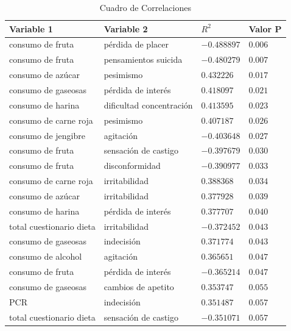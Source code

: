 \documentclass[stu, 12pt]{apa7}
\begin{document}
\begin{table}[H]
	\begin{tabular}{@{}llll@{}}
	\toprule
	\textbf{Variable 1}      & \textbf{Variable 2}      & \textbf{$R^2$}       & \textbf{Valor P} \\ \midrule
		consumo de fruta         & pérdida de placer        & $-0.488897$            & $0.006$   \\
		consumo de fruta         & pensamientos suicida     & $-0.480279$            & $0.007$   \\
		consumo de azúcar        & pesimismo                & $0.432226$             & $0.017$   \\
		consumo de gaseosas      & pérdida de interés       & $0.418097$             & $0.021$   \\
		consumo de harina        & dificultad concentración & $0.413595$             & $0.023$   \\
		consumo de carne roja    & pesimismo                & $0.407187$             & $0.026$   \\
		consumo de jengibre      & agitación                & $-0.403648$            & $0.027$   \\
		consumo de fruta         & sensación de castigo     & $-0.397679$            & $0.030$   \\
		consumo de fruta         & disconformidad           & $-0.390977$            & $0.033$   \\
		consumo de carne roja    & irritabilidad            & $0.388368$             & $0.034$   \\
		consumo de azúcar        & irritabilidad            & $0.377928$             & $0.039$   \\
		consumo de harina        & pérdida de interés       & $0.377707$             & $0.040$   \\
		total cuestionario dieta & irritabilidad            & $-0.372452$            & $0.043$   \\
		consumo de gaseosas      & indecisión               & $0.371774$             & $0.043$   \\
		consumo de alcohol       & agitación                & $0.365651$             & $0.047$   \\
		consumo de fruta         & pérdida de interés       & $-0.365214$            & $0.047$   \\
		consumo de gaseosas      & cambios de apetito       & $0.353747$             & $0.055$   \\
		PCR                      & indecisión               & $0.351487$             & $0.057$   \\
		total cuestionario dieta & sensación de castigo     & $-0.351071$            & $0.057$   \\ \bottomrule
	\end{tabular}%
	\caption{Cuadro de Correlaciones}
	\label{tab:tableOfCorr}
	\end{table}
\end{document}
